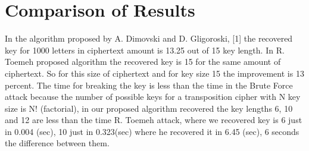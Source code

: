  \section{Comparison of Results}
 In the algorithm proposed by A. Dimovski and D.
Gligoroski, [1] the recovered key for 1000 letters in
ciphertext amount is 13.25 out of 15 key length. In R. Toemeh \cite{toemeh2007breaking} proposed algorithm the recovered key is 15 for the same
amount of ciphertext. So for this size of ciphertext and for
key size 15 the improvement is 13 percent. The time for
breaking the key is less than the time in the Brute Force
attack because the number of possible keys for a
transposition cipher with N key size is N! (factorial), in our proposed algorithm recovered the  key lengths 6, 10 and 12 are less than the time R. Toemeh attack, where we recovered key is 6 just in 0.004 (sec),
10 just in 0.323(sec) where he recovered it in 6.45 (sec), 6 seconds the difference between them.